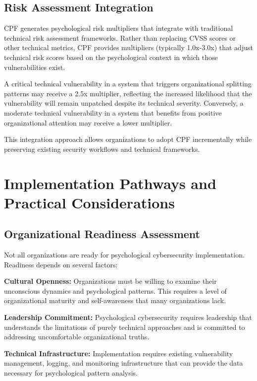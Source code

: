 \documentclass[10pt, twocolumn]{article}
\begin{document}
\subsection{Risk Assessment Integration}

CPF generates psychological risk multipliers that integrate with traditional technical risk assessment frameworks. Rather than replacing CVSS scores or other technical metrics, CPF provides multipliers (typically 1.0x-3.0x) that adjust technical risk scores based on the psychological context in which those vulnerabilities exist.

A critical technical vulnerability in a system that triggers organizational splitting patterns may receive a 2.5x multiplier, reflecting the increased likelihood that the vulnerability will remain unpatched despite its technical severity. Conversely, a moderate technical vulnerability in a system that benefits from positive organizational attention may receive a lower multiplier.

This integration approach allows organizations to adopt CPF incrementally while preserving existing security workflows and technical frameworks.

\section{Implementation Pathways and Practical Considerations}

\subsection{Organizational Readiness Assessment}

Not all organizations are ready for psychological cybersecurity implementation. Readiness depends on several factors:

\textbf{Cultural Openness:} Organizations must be willing to examine their unconscious dynamics and psychological patterns. This requires a level of organizational maturity and self-awareness that many organizations lack.

\textbf{Leadership Commitment:} Psychological cybersecurity requires leadership that understands the limitations of purely technical approaches and is committed to addressing uncomfortable organizational truths.

\textbf{Technical Infrastructure:} Implementation requires existing vulnerability management, logging, and monitoring infrastructure that can provide the data necessary for psychological pattern analysis.
\end{document}
